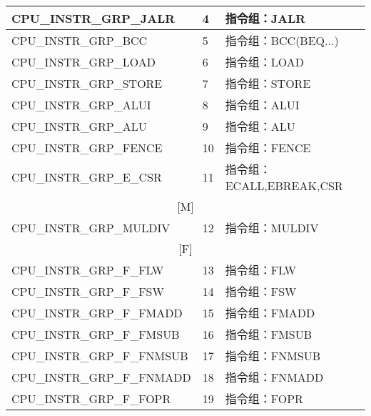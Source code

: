 \begin{center}
\begin{tabular}{|l|p{3cm}|p{6cm}|}
    CPU\_INSTR\_GRP\_JALR & 4 & 指令组：JALR\\\hline
    CPU\_INSTR\_GRP\_BCC & 5 & 指令组：BCC(BEQ...)\\\hline
    CPU\_INSTR\_GRP\_LOAD & 6 & 指令组：LOAD\\\hline
    CPU\_INSTR\_GRP\_STORE & 7 & 指令组：STORE\\\hline
    CPU\_INSTR\_GRP\_ALUI & 8 & 指令组：ALUI\\\hline
    CPU\_INSTR\_GRP\_ALU & 9 & 指令组：ALU\\\hline
    CPU\_INSTR\_GRP\_FENCE & 10 & 指令组：FENCE\\\hline
    CPU\_INSTR\_GRP\_E\_CSR & 11 & 指令组：ECALL,EBREAK,CSR\\\hline
    \multicolumn{3}{|c|}{[M]}\\\hline
    CPU\_INSTR\_GRP\_MULDIV & 12 & 指令组：MULDIV\\\hline
    \multicolumn{3}{|c|}{[F]}\\\hline
    CPU\_INSTR\_GRP\_F\_FLW & 13 & 指令组：FLW\\\hline
    CPU\_INSTR\_GRP\_F\_FSW & 14 & 指令组：FSW\\\hline
    CPU\_INSTR\_GRP\_F\_FMADD & 15 & 指令组：FMADD\\\hline
    CPU\_INSTR\_GRP\_F\_FMSUB & 16 & 指令组：FMSUB\\\hline
    CPU\_INSTR\_GRP\_F\_FNMSUB & 17 & 指令组：FNMSUB\\\hline
    CPU\_INSTR\_GRP\_F\_FNMADD & 18 & 指令组：FNMADD\\\hline
    CPU\_INSTR\_GRP\_F\_FOPR & 19 & 指令组：FOPR\\\hline
\end{tabular}
\end{center}